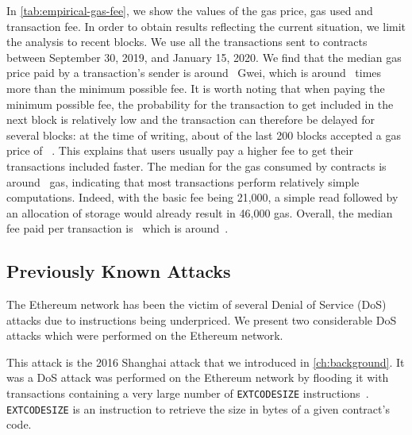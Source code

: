 In \autoref{tab:empirical-gas-fee}, we show the values of the gas price, gas used and transaction fee.
In order to obtain results reflecting the current situation, we limit the analysis to recent blocks.
We use all the transactions sent to contracts between September 30, 2019, and January 15, 2020.
We find that the median gas price paid by a transaction's sender is around~ Gwei, which is around~ times more than the minimum possible fee.
It is worth noting that when paying the minimum possible fee, the probability for the transaction to get included in the next block is relatively low and the transaction can therefore be delayed for several blocks: at the time of writing, about  of the last 200 blocks accepted a gas price of ~\cite{eth-gas-station}.
This explains that users usually pay a higher fee to get their transactions included faster.
The median for the gas consumed by contracts is around~ gas, indicating that most transactions perform relatively simple computations.
Indeed, with the basic fee being 21,000, a simple read followed by an allocation of storage would already result in 46,000 gas.
Overall, the median fee paid per transaction is~ which is around~.


\subsection{Previously Known Attacks}
The Ethereum network has been the victim of several Denial of Service (DoS) attacks due to instructions being underpriced. We present two considerable DoS attacks which were performed on the Ethereum network.

This attack is the 2016 Shanghai attack that we introduced in \autoref{ch:background}.
It was a DoS attack was performed on the Ethereum network by flooding it with transactions containing a very large number of \lstinline{EXTCODESIZE} instructions~\cite{transaction-spam-attack}.
\lstinline{EXTCODESIZE} is an instruction to retrieve the size in bytes of a given contract's code.

